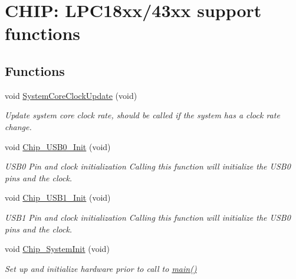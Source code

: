 \hypertarget{group___s_u_p_p_o_r_t__18_x_x__43_x_x___f_u_n_c}{}\section{C\+H\+IP\+: L\+P\+C18xx/43xx support functions}
\label{group___s_u_p_p_o_r_t__18_x_x__43_x_x___f_u_n_c}
\subsection*{Functions}
\begin{DoxyCompactItemize}
\item 
void \hyperlink{group___s_u_p_p_o_r_t__18_x_x__43_x_x___f_u_n_c_gae0c36a9591fe6e9c45ecb21a794f0f0f}{System\+Core\+Clock\+Update} (void)
\begin{DoxyCompactList}\small\item\em Update system core clock rate, should be called if the system has a clock rate change. \end{DoxyCompactList}\item 
void \hyperlink{group___s_u_p_p_o_r_t__18_x_x__43_x_x___f_u_n_c_ga3d92558011a1b37fdc6a0687691127c4}{Chip\+\_\+\+U\+S\+B0\+\_\+\+Init} (void)
\begin{DoxyCompactList}\small\item\em U\+S\+B0 Pin and clock initialization Calling this function will initialize the U\+S\+B0 pins and the clock. \end{DoxyCompactList}\item 
void \hyperlink{group___s_u_p_p_o_r_t__18_x_x__43_x_x___f_u_n_c_ga89df58e269eb3a9001c3eeafbbc95473}{Chip\+\_\+\+U\+S\+B1\+\_\+\+Init} (void)
\begin{DoxyCompactList}\small\item\em U\+S\+B1 Pin and clock initialization Calling this function will initialize the U\+S\+B0 pins and the clock. \end{DoxyCompactList}\item 
void \hyperlink{group___s_u_p_p_o_r_t__18_x_x__43_x_x___f_u_n_c_ga3450fa020f6b569cc2deb69c11e11b7c}{Chip\+\_\+\+System\+Init} (void)
\begin{DoxyCompactList}\small\item\em Set up and initialize hardware prior to call to \hyperlink{group__samples_ga840291bc02cba5474a4cb46a9b9566fe}{main()} \end{DoxyCompactList}\item 

\end{DoxyCompactItemize}

